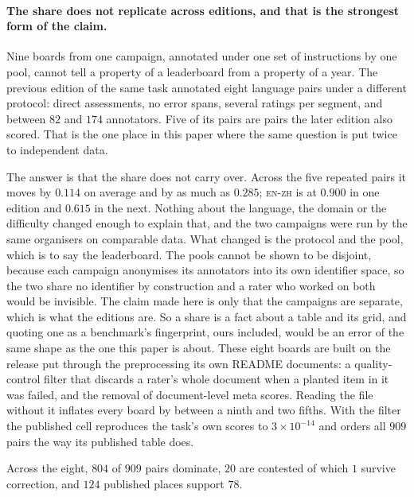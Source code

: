 \paragraph{The share does not replicate across editions, and that is the strongest form of the
claim.} Nine boards from one campaign, annotated under one set of instructions by one pool, cannot
tell a property of a leaderboard from a property of a year. The previous edition of the same task
annotated eight language pairs under a different protocol: direct assessments, no error spans,
several ratings per segment, and between $82$ and $174$ annotators. Five of its pairs are
pairs the later edition also scored. That is the one place in this paper where the same question is
put twice to independent data.

The answer is that the share does not carry over. Across the five repeated pairs it moves by $0.114$
on average and by as much as $0.285$; \textsc{en-zh} is at $0.900$ in one edition and $0.615$ in the
next. Nothing about the language, the domain or the difficulty changed enough to explain that, and
the two campaigns were run by the same organisers on comparable data. What changed is the protocol and the
pool, which is to say the leaderboard. The pools cannot be shown to be disjoint, because each campaign
anonymises its annotators into its own identifier space, so the two share no identifier by
construction and a rater who worked on both would be invisible. The claim made here is only
that the campaigns are separate, which is what the editions are. So a share is a fact about a table and its grid, and
quoting one as a benchmark's fingerprint, ours included, would be an error of the same shape
as the one this paper is about. These eight boards are built on the release put through the preprocessing its own README documents: a quality-control filter that discards a rater's whole document when a planted item in
it was failed, and the removal of document-level meta scores. Reading the file without it inflates every board by between a ninth and two fifths. With the filter the published
cell reproduces the task's own scores to $3\times10^{-14}$ and orders all $909$ pairs the way its
published table does.

Across the eight, $804$ of $909$ pairs dominate, $20$ are contested
of which $1$ survive correction, and $124$ published places support $78$.


